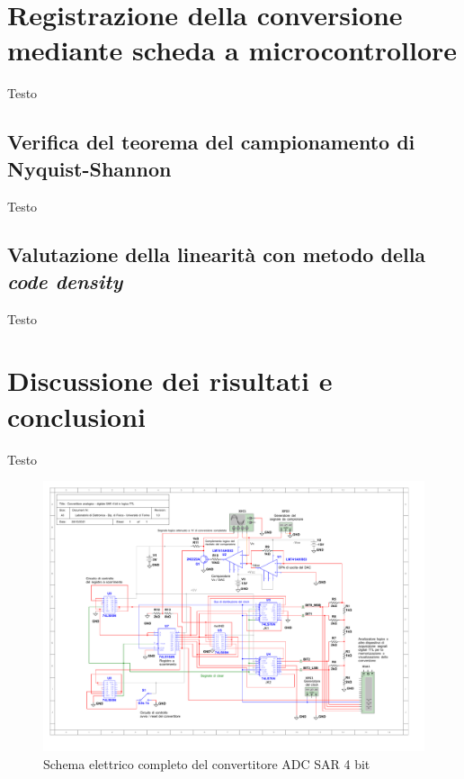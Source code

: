 \documentclass[journal]{IEEEtran}
\begin{document}
\section{Registrazione della conversione mediante scheda a microcontrollore}
Testo

\subsection{Verifica del teorema del campionamento di Nyquist-Shannon}
Testo

\subsection{Valutazione della linearità con metodo della \textit{code density}}
Testo

\section{Discussione dei risultati e conclusioni}
Testo


\begin{figure}[t]%
\centering
\begin{center}
\includegraphics[trim = {0 0 50 0}, width=1.40\textwidth, angle=90]{sch-simulations/digital/output/Schema_convertitore_completo.pdf}
\end{center}
\caption{Schema elettrico completo del convertitore ADC SAR 4 bit}
\label{fig:circuit_sarCompleteSchematic}
\end{figure}
\end{document}
